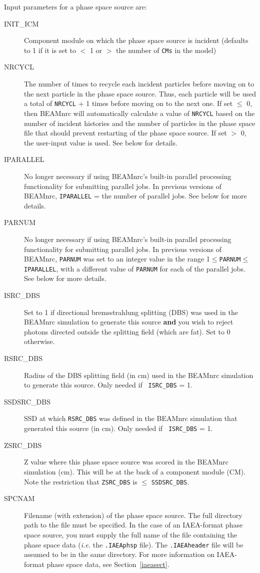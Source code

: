 \documentclass[12pt,twoside]{article}
\begin{document}
Input parameters for a phase space source are:
\begin{description}
\item [INIT\_ICM] Component module on which the phase space source is
incident (defaults to 1 if it is set to $<$ 1 or $>$ the number of
\verb+CMs+
in the model)
\item [NRCYCL] The number of times to recycle each incident particles before
moving on to the next particle in the phase space source.  Thus, each
particle will be used a total of {\tt NRCYCL} + 1 times before moving
on to the next one.  If set $\leq$ 0, then BEAMnrc will automatically
calculate a value of {\tt NRCYCL} based on the number of incident histories
and the number of particles in the phase space file that should prevent
restarting of the phase space source.  If set $>$ 0, the user-input value
is used.  See below for details.
\item [IPARALLEL]  No longer necessary if using BEAMnrc's built-in
parallel processing functionality for submitting parallel jobs.  In
previous versions of BEAMnrc, {\tt IPARALLEL} = the number of parallel jobs.
See below for more details.
\item [PARNUM] No longer necessary if using BEAMnrc's built-in
parallel processing functionality for submitting parallel jobs.  In
previous versions of BEAMnrc, {\tt PARNUM}
was set to an integer value in the range 1$\leq${\tt PARNUM}$\leq$
{\tt IPARALLEL}, with a different value of {\tt PARNUM} for each of
the parallel jobs.  See below for more details.
\item [ISRC\_DBS] Set to 1 if directional bremsstrahlung splitting (DBS)
was used in the BEAMnrc simulation to generate this source {\bf and} you wish to
reject photons directed outside the splitting field (which are fat).  Set to 0
otherwise.
\item [RSRC\_DBS] Radius of the DBS splitting field (in cm) used in the
BEAMnrc simulation to generate this source. Only needed if {\tt
ISRC\_DBS} = 1.
\item [SSDSRC\_DBS] SSD at which {\tt RSRC\_DBS} was defined in the BEAMnrc
simulation that generated this source (in cm). Only needed if {\tt
ISRC\_DBS} = 1.
\item [ZSRC\_DBS] Z value where this phase space source was scored
                     in the BEAMnrc simulation (cm).  This will be at the back
                     of a component module (CM).  Note the restriction that
                     {\tt ZSRC\_DBS} is $\leq$ {\tt SSDSRC\_DBS}.
\item [SPCNAM] Filename (with extension) of the phase space source. The full
directory path to the file must be specified.  In the
case of an IAEA-format phase space source, you must supply the full name
of the file containing the phase space data ({\em i.e.} the {\tt .IAEAphsp}
file).  The {\tt .IAEAheader} file will be assumed to be in the same
directory.  For more information on IAEA-format phase space data, see
Section~\ref{iaeasect}.
\end{description}
\end{document}
